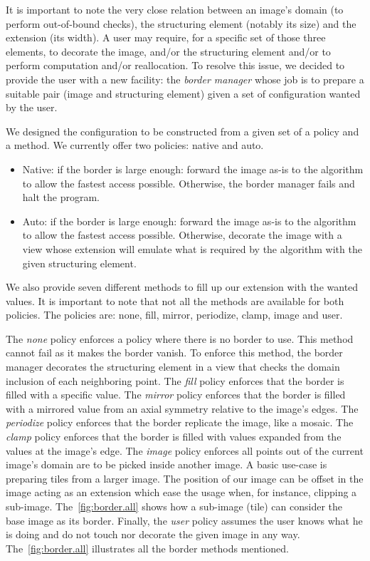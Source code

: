 It is important to note the very close relation between an image's domain (to perform out-of-bound checks), the
structuring element (notably its size) and the extension (its width). A user may require, for a specific set of those
three elements, to decorate the image, and/or the structuring element and/or to perform computation and/or reallocation.
To resolve this issue, we decided to provide the user with a new facility: the \emph{border manager} whose job is to
prepare a suitable pair (image and structuring element) given a set of configuration wanted by the user.

We designed the configuration to be constructed from a given set of a policy and a method. We currently offer two
policies: native and auto.

\begin{itemize}
  \item Native: if the border is large enough: forward the image as-is to the algorithm to allow the fastest access
        possible. Otherwise, the border manager fails and halt the program.
  \item Auto: if the border is large enough: forward the image as-is to the algorithm to allow the fastest access
        possible. Otherwise, decorate the image with a view whose extension will emulate what is required by the
        algorithm with the given structuring element.
\end{itemize}

We also provide seven different methods to fill up our extension with the wanted values. It is important to note that
not all the methods are available for both policies. The policies are: none, fill, mirror, periodize, clamp, image and
user.

The \emph{none} policy enforces a policy where there is no border to use. This method cannot fail as it makes the border
vanish. To enforce this method, the border manager decorates the structuring element in a view that checks the domain
inclusion of each neighboring point. The \emph{fill} policy enforces that the border is filled with a specific value.
The \emph{mirror} policy enforces that the border is filled with a mirrored value from an axial symmetry relative to the
image's edges. The \emph{periodize} policy enforces that the border replicate the image, like a mosaic. The \emph{clamp}
policy enforces that the border is filled with values expanded from the values at the image's edge. The \emph{image}
policy enforces all points out of the current image's domain are to be picked inside another image. A basic use-case is
preparing tiles from a larger image. The position of our image can be offset in the image acting as an extension which
ease the usage when, for instance, clipping a sub-image. The~\cref{fig:border.all} shows how a sub-image (tile) can
consider the base image as its border. Finally, the \emph{user} policy assumes the user knows what he is doing and do
not touch nor decorate the given image in any way. The~\cref{fig:border.all} illustrates all the border methods
mentioned.


